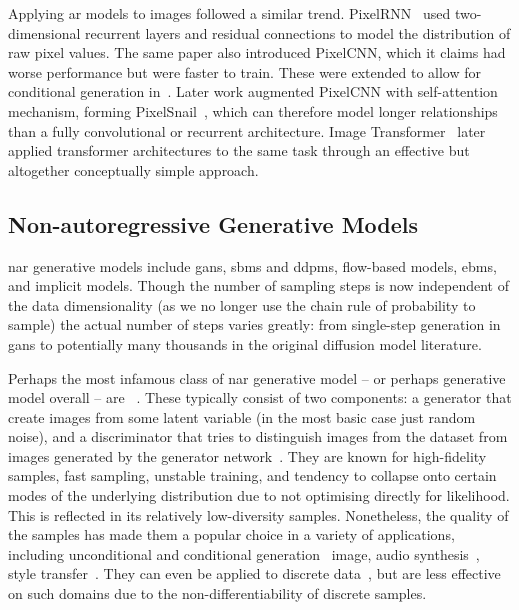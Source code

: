 Applying \gls{ar} models to images followed a similar trend.
PixelRNN~\cite{oord2016pixelrnn} used two-dimensional recurrent layers and
residual connections to model the distribution of raw pixel values. The same
paper also introduced PixelCNN, which it claims had worse performance but were
faster to train. These were extended to allow for conditional generation
in~\cite{oord2016pixelcnn}. Later work augmented PixelCNN with self-attention
mechanism, forming PixelSnail~\cite{chen2017snail}, which can therefore model
longer relationships than a fully convolutional or recurrent architecture. Image
Transformer~\cite{parmar2018image} later applied transformer architectures to
the same task through an effective but altogether conceptually simple approach.

\subsection{Non-autoregressive Generative Models}
\label{subsec:nagm}
\Acrfull{nar} generative models include \glspl{gan}, \glspl{sbm} and
\glspl{ddpm}, flow-based models, \glspl{ebm}, and implicit models. Though the
number of sampling steps is now independent of the data dimensionality (as we no
longer use the chain rule of probability to sample) the actual number of steps
varies greatly: from single-step generation in \glspl{gan} to potentially many
thousands in the original diffusion model literature.


Perhaps the most infamous class of \gls{nar} generative model -- or perhaps
generative model overall -- are ~\cite{goodfellow2014gan}. These
typically consist of two components: a generator that create images from some
latent variable (in the most basic case just random noise), and a discriminator
that tries to distinguish images from the dataset from images generated by the
generator network~\cite{goodfellow2014gan}. They are known for high-fidelity
samples, fast sampling, unstable training, and tendency to collapse onto certain
modes of the underlying distribution due to not optimising directly for
likelihood. This is reflected in its relatively low-diversity samples.
Nonetheless, the quality of the samples has made them a popular choice in a
variety of applications, including unconditional and conditional
generation~\cite{tero2018stylegan,andrew2018biggan} image, audio
synthesis~\cite{liu2020audiogan}, style transfer~\cite{zhu2017cyclegan}. They
can even be applied to discrete data~\cite{autume2019scratchgan}, but are less
effective on such domains due to the non-differentiability of discrete samples.

